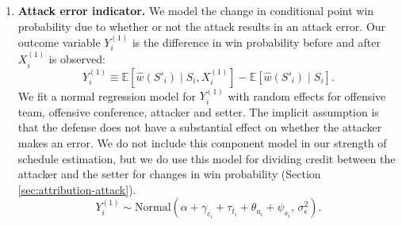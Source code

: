 \documentclass[USenglish]{article}
\theoremstyle{dgthm}
\theoremstyle{dgdef}
\begin{document}
\begin{enumerate}
    \item
        {\bf Attack error indicator.} We model the change in conditional point win probability due to whether or not the attack results in an attack error. Our outcome variable $Y_i^{(1)}$ is the difference in win probability before and after $X_i^{(1)}$ is observed:
        \begin{equation*}
            Y_i^{(1)} \equiv \mathbb{E}\left[\hat w(S'_i) \mid S_i, X_i^{(1)}\right] - \mathbb{E}\left[\hat w(S'_i) \mid S_i\right].
        \end{equation*}
        We fit a normal regression model for $Y_i^{(1)}$ with random effects for offensive team, offensive conference, attacker and setter. The implicit assumption is that the defense does not have a substantial effect on whether the attacker makes an error. We do not include this component model in our strength of schedule estimation, but we do use this model for dividing credit between the attacker and the setter for changes in win probability (Section \ref{sec:attribution-attack}).
        \begin{equation}
        \label{eqn:attack-model-1}
            Y_i^{(1)} \sim \mbox{Normal}\left(
                \alpha + \gamma_{c_i} + \tau_{t_i} + \theta_{a_i} + \psi_{s_i},\,
                \sigma^2_\epsilon
            \right).
        \end{equation}


\end{enumerate}
\end{document}
